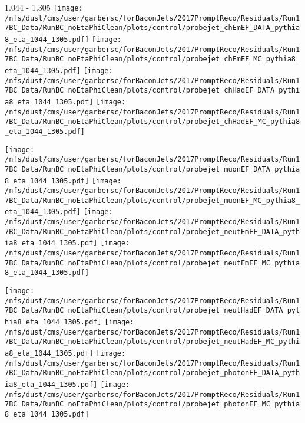 \documentclass[t,compress]{beamer}
\begin{document}
\begin{frame}{1.044 - 1.305}
	\texttt{[image: /nfs/dust/cms/user/garbersc/forBaconJets/2017PromptReco/Residuals/Run17BC\_Data/RunBC\_noEtaPhiClean/plots/control/probejet\_chEmEF\_DATA\_pythia8\_eta\_1044\_1305.pdf]}
	\texttt{[image: /nfs/dust/cms/user/garbersc/forBaconJets/2017PromptReco/Residuals/Run17BC\_Data/RunBC\_noEtaPhiClean/plots/control/probejet\_chEmEF\_MC\_pythia8\_eta\_1044\_1305.pdf]}
	\texttt{[image: /nfs/dust/cms/user/garbersc/forBaconJets/2017PromptReco/Residuals/Run17BC\_Data/RunBC\_noEtaPhiClean/plots/control/probejet\_chHadEF\_DATA\_pythia8\_eta\_1044\_1305.pdf]}
	\texttt{[image: /nfs/dust/cms/user/garbersc/forBaconJets/2017PromptReco/Residuals/Run17BC\_Data/RunBC\_noEtaPhiClean/plots/control/probejet\_chHadEF\_MC\_pythia8\_eta\_1044\_1305.pdf]}
\newline

\vspace{-0.65cm}
	\texttt{[image: /nfs/dust/cms/user/garbersc/forBaconJets/2017PromptReco/Residuals/Run17BC\_Data/RunBC\_noEtaPhiClean/plots/control/probejet\_muonEF\_DATA\_pythia8\_eta\_1044\_1305.pdf]}
	\texttt{[image: /nfs/dust/cms/user/garbersc/forBaconJets/2017PromptReco/Residuals/Run17BC\_Data/RunBC\_noEtaPhiClean/plots/control/probejet\_muonEF\_MC\_pythia8\_eta\_1044\_1305.pdf]}
	\texttt{[image: /nfs/dust/cms/user/garbersc/forBaconJets/2017PromptReco/Residuals/Run17BC\_Data/RunBC\_noEtaPhiClean/plots/control/probejet\_neutEmEF\_DATA\_pythia8\_eta\_1044\_1305.pdf]}
	\texttt{[image: /nfs/dust/cms/user/garbersc/forBaconJets/2017PromptReco/Residuals/Run17BC\_Data/RunBC\_noEtaPhiClean/plots/control/probejet\_neutEmEF\_MC\_pythia8\_eta\_1044\_1305.pdf]}
\newline

\vspace{-0.65cm}
	\texttt{[image: /nfs/dust/cms/user/garbersc/forBaconJets/2017PromptReco/Residuals/Run17BC\_Data/RunBC\_noEtaPhiClean/plots/control/probejet\_neutHadEF\_DATA\_pythia8\_eta\_1044\_1305.pdf]}
	\texttt{[image: /nfs/dust/cms/user/garbersc/forBaconJets/2017PromptReco/Residuals/Run17BC\_Data/RunBC\_noEtaPhiClean/plots/control/probejet\_neutHadEF\_MC\_pythia8\_eta\_1044\_1305.pdf]}
	\texttt{[image: /nfs/dust/cms/user/garbersc/forBaconJets/2017PromptReco/Residuals/Run17BC\_Data/RunBC\_noEtaPhiClean/plots/control/probejet\_photonEF\_DATA\_pythia8\_eta\_1044\_1305.pdf]}
	\texttt{[image: /nfs/dust/cms/user/garbersc/forBaconJets/2017PromptReco/Residuals/Run17BC\_Data/RunBC\_noEtaPhiClean/plots/control/probejet\_photonEF\_MC\_pythia8\_eta\_1044\_1305.pdf]}
\end{frame}
\end{document}
